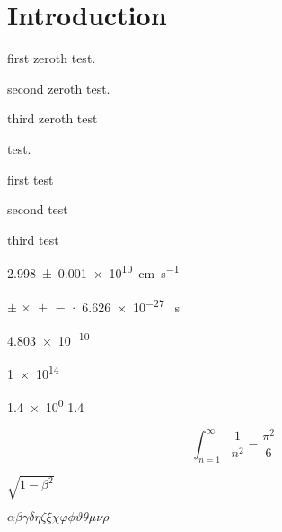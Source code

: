 \chapter{Introduction}
\label{ch:introduction}


first zeroth test. \supercite{Carpio_2020, Alvarez_2004, Jackson_1999}

second zeroth test. \supercite{Carpio_2020, Alvarez_2004}

third zeroth test \supercite{Carpio_2020, Jackson_1999}

test. \supercite{Li_2012}

first test \cite{Carpio_2020, Alvarez_2004, Jackson_1999}

second test \cite{Carpio_2020, Alvarez_2004}

third test \cite{Carpio_2020, Jackson_1999}

\cite{Thompson_1993}

\cite{Li_2012}

\cite{Haskell_2018}

\qty{2.998+-0.001e10}{\centi\meter\per\second}

$\pm\,\times\,+\,-\,\cdot$ \num{6.626e-27}
\unit{\erg\second}

\qty{4.803e-10}{\esu}

\qty{1e14}{\gauss}

\num{1.4e0} \num{1.4}

\begin{equation}
\int_{n=1}^\infty \frac{1}{n^2}=\frac{\pi^2}{6}
\end{equation}

$\sqrt{1 - \beta^2}$

$\alpha \beta \gamma \delta \eta \zeta \xi \chi \varphi \phi \vartheta \theta \mu \nu \rho$

